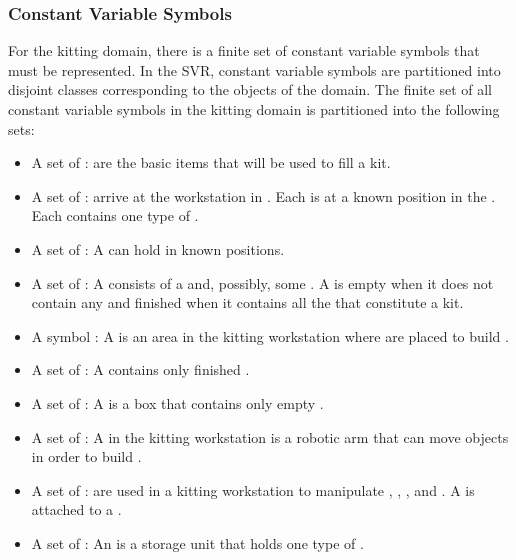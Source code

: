 \subsubsection{Constant Variable Symbols}
For the kitting domain, there is a finite set of constant variable symbols that must be represented. In the SVR, constant variable symbols are partitioned into disjoint classes corresponding to the objects of the domain. The finite set of all constant variable symbols in the kitting domain is partitioned into the following sets:
\begin{itemize}
\item A set of :  are the basic items that will be used to fill a kit.

\item A set of :  arrive at the workstation in . Each  is at a known position in the . Each  contains one type of .

\item A set of :  A  can hold  in known positions.

\item A set of : A  consists of a  and, possibly, some . A  is empty when it does not contain any  and finished when it contains all the  that constitute a kit.

\item A symbol : A  is an area in the kitting workstation where  are placed to build .

\item A set of : A  contains only finished .

\item A set of : A  is a box that contains only empty .

\item A set of : A  in the kitting workstation is a robotic arm that can move objects in order to build .

\item A set of :  are used in a kitting workstation to manipulate , , , and . A  is attached to a .

\item A set of : An  is a storage unit that holds one type of .

\end{itemize}

